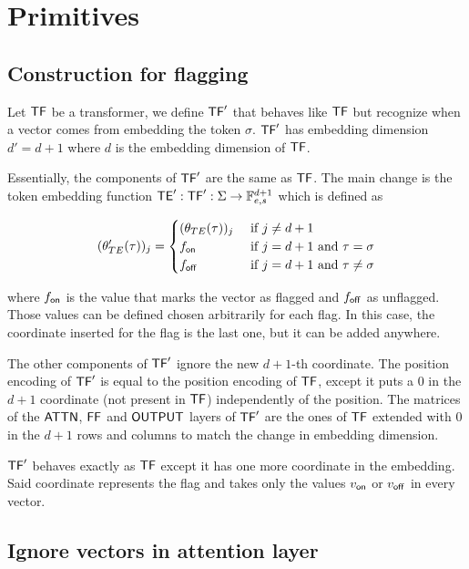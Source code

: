 \chapter{Primitives}

\section{Construction for flagging}\label{appendix:flags}

Let $\mathsf{TF}$ be a transformer, we define $\mathsf{TF}'$ that behaves like $\mathsf{TF}$ but recognize when a vector comes from embedding the token $\sigma$.
$\mathsf{TF}'$ has embedding dimension $d' = d + 1$ where $d$ is the embedding dimension of $\mathsf{TF}$.

Essentially, the components of $\mathsf{TF}'$ are the same as $\mathsf{TF}$.
The main change is the token embedding function $\mathsf{TE}' : \mathsf{TF}' : \Sigma \to \mathbb{F}_{e,s}^{d+1}$ which is defined as

\begin{equation*}
    (\theta'_{TE}(\tau))_j = \begin{cases}
        (\theta_{TE}(\tau))_j  & \text{ if } j \neq d+1 \\
        f_{\mathsf{on}}                & \text{ if } j = d+1  \text{ and } \tau = \sigma \\
        f_{\mathsf{off}}               & \text{ if } j = d+1  \text{ and } \tau \neq \sigma
    \end{cases}
\end{equation*}

\noindent where $f_{\mathsf{on}}$ is the value that marks the vector as flagged and $f_{\mathsf{off}}$ as unflagged.
Those values can be defined chosen arbitrarily for each flag.
In this case, the coordinate inserted for the flag is the last one, but it can be added anywhere.

The other components of $\mathsf{TF}'$ ignore the new $d+1$-th coordinate.
The position encoding of $\mathsf{TF}'$ is equal to the position encoding of $\mathsf{TF}$, except it puts a $0$ in the $d+1$ coordinate (not present in $\mathsf{TF}$) independently of the position.
The matrices of the $\mathsf{ATTN}$, $\mathsf{FF}$ and $\mathsf{OUTPUT}$ layers of $\mathsf{TF}'$ are the ones of $\mathsf{TF}$ extended with $0$ in the $d+1$ rows and columns to match the change in embedding dimension.

$\mathsf{TF}'$ behaves exactly as $\mathsf{TF}$ except it has one more coordinate in the embedding.
Said coordinate represents the flag and takes only the values $v_{\mathsf{on}}$ or $v_{\mathsf{off}}$ in every vector.


\section{Ignore vectors in attention layer}\label{appendix:ignore-vectors-attn}

